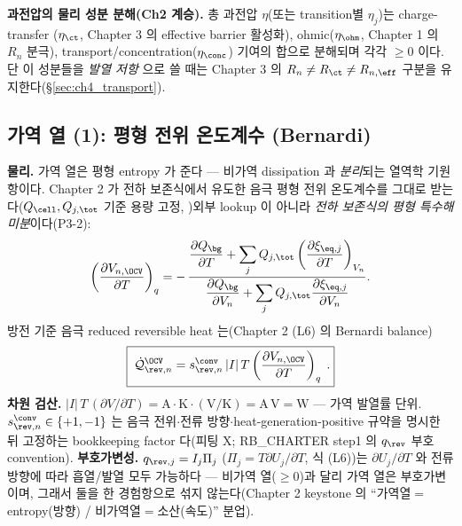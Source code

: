 \textbf{과전압의 물리 성분 분해(Ch2 계승).} 총 과전압 $\eta$(또는 transition별 $\eta_j$)는 charge-transfer
($\eta_\ct$, Chapter 3 의 effective barrier 활성화), ohmic($\eta_\ohm$, Chapter 1 의 $R_n$ 분극),
transport/concentration($\eta_\conc$) 기여의 합으로 분해되며 각각 $\ge0$ 이다. 단 이 성분들을 \emph{발열 저항}
으로 쓸 때는 Chapter 3 의 $R_n\ne R_\ct\ne R_{n,\eff}$ 구분을 유지한다(\S\ref{sec:ch4_transport}).

\subsection{가역 열 (1): 평형 전위 온도계수 (Bernardi)}\label{sec:ch4_revOCV}
\textbf{물리.} 가역 열은 평형 entropy 가 준다 — 비가역 dissipation 과 \emph{분리}되는 열역학 기원 항이다.
Chapter 2 가 전하 보존식에서 유도한 음극 평형 전위 온도계수를 그대로 받는다($Q_\cell,Q_{j,\tot}$ 기준 용량
고정, )\textemdash 외부 lookup 이 아니라 \emph{전하 보존식의 평형 특수해 미분}이다(P3-2):
\begin{equation}
\left(\frac{\partial V_{n,\OCV}}{\partial T}\right)_q
=-\,\frac{\dfrac{\partial Q_\bg}{\partial T}+\displaystyle\sum_j Q_{j,\tot}\left(\dfrac{\partial\xi_{\eq,j}}{\partial T}\right)_{V_n}}
{\dfrac{\partial Q_\bg}{\partial V_n}+\displaystyle\sum_j Q_{j,\tot}\dfrac{\partial\xi_{\eq,j}}{\partial V_n}}.
\label{eq:ch4_ocv_dvdt}
\end{equation}
방전 기준 음극 reduced reversible heat 는(Chapter 2 (L6) 의 Bernardi balance)
\begin{equation}
\boxed{\;\dot{\mathcal Q}_{\rev,n}^{\OCV}=s_{\rev,n}^{\conv}\,|I|\,T\left(\frac{\partial V_{n,\OCV}}{\partial T}\right)_q\;.}
\label{eq:ch4_rev_ocv}
\end{equation}
\textbf{차원 검산.} $|I|\,T\,(\partial V/\partial T)=\mathrm A\cdot\mathrm K\cdot(\mathrm{V/K})=\mathrm{A\,V}=\mathrm W$
— 가역 발열률 단위. $s_{\rev,n}^{\conv}\in\{+1,-1\}$ 는 음극 전위$\cdot$전류 방향$\cdot$heat-generation-positive
규약을 명시한 뒤 고정하는 bookkeeping factor 다(피팅 X; RB\_CHARTER step1 의 $q_\rev$ 부호 convention).
\textbf{부호가변성.} $q_{\rev,j}=I_j\Pi_j$ ($\Pi_j=T\partial U_j/\partial T$, 식 (L6))는 $\partial U_j/\partial T$
와 전류 방향에 따라 흡열/발열 모두 가능하다 — 비가역 열($\ge0$)과 달리 가역 열은 부호가변이며, 그래서 둘을 한
경험항으로 섞지 않는다(Chapter 2 keystone 의 ``가역열$=$entropy(방향) / 비가역열$=$소산(속도)'' 분업).


